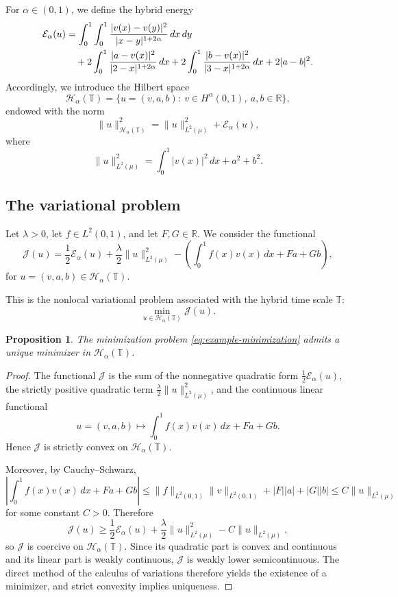 \documentclass[11pt]{article}
\numberwithin{equation}{section}
\newtheorem{proposition}[theorem]{Proposition}
\theoremstyle{definition}
\begin{document}
For $\alpha\in(0,1)$, we define the hybrid energy
\begin{align}
\mathcal E_\alpha(u)
&=
\int_0^1\int_0^1
\frac{|v(x)-v(y)|^2}{|x-y|^{1+2\alpha}}\,dx\,dy
\notag\\
&\quad
+2\int_0^1\frac{|a-v(x)|^2}{|2-x|^{1+2\alpha}}\,dx
+2\int_0^1\frac{|b-v(x)|^2}{|3-x|^{1+2\alpha}}\,dx
+2|a-b|^2.
\label{eq:example-energy}
\end{align}
Accordingly, we introduce the Hilbert space
\[
\mathcal H_\alpha(\mathbb T)
=
\bigl\{u=(v,a,b):\ v\in H^\alpha(0,1),\ a,b\in\mathbb R\bigr\},
\]
endowed with the norm
\[
\|u\|_{\mathcal H_\alpha(\mathbb T)}^2
=
\|u\|_{L^2(\mu)}^2+\mathcal E_\alpha(u),
\]
where
\[
\|u\|_{L^2(\mu)}^2=\int_0^1 |v(x)|^2\,dx+a^2+b^2.
\]

\subsection{The variational problem}

Let $\lambda>0$, let $f\in L^2(0,1)$, and let $F,G\in\mathbb R$. We consider the functional
\begin{equation}\label{eq:example-functional}
\mathcal J(u)
=
\frac12\mathcal E_\alpha(u)
+\frac{\lambda}{2}\|u\|_{L^2(\mu)}^2
-
\left(
\int_0^1 f(x)v(x)\,dx+Fa+Gb
\right),
\end{equation}
for $u=(v,a,b)\in \mathcal H_\alpha(\mathbb T)$.

This is the nonlocal variational problem associated with the hybrid time scale $\mathbb T$:
\begin{equation}\label{eq:example-minimization}
\min_{u\in \mathcal H_\alpha(\mathbb T)} \mathcal J(u).
\end{equation}

\begin{proposition}\label{prop:example-existence}
The minimization problem \eqref{eq:example-minimization} admits a unique minimizer in $\mathcal H_\alpha(\mathbb T)$.
\end{proposition}

\begin{proof}
The functional $\mathcal J$ is the sum of the nonnegative quadratic form $\frac12\mathcal E_\alpha(u)$, the strictly positive quadratic term $\frac{\lambda}{2}\|u\|_{L^2(\mu)}^2$, and the continuous linear functional
\[
u=(v,a,b)\mapsto \int_0^1 f(x)v(x)\,dx+Fa+Gb.
\]
Hence $\mathcal J$ is strictly convex on $\mathcal H_\alpha(\mathbb T)$.

Moreover, by Cauchy--Schwarz,
\[
\left|\int_0^1 f(x)v(x)\,dx+Fa+Gb\right|
\le
\|f\|_{L^2(0,1)}\|v\|_{L^2(0,1)}+|F||a|+|G||b|
\le
C\|u\|_{L^2(\mu)}
\]
for some constant $C>0$. Therefore
\[
\mathcal J(u)
\ge
\frac12\mathcal E_\alpha(u)+\frac{\lambda}{2}\|u\|_{L^2(\mu)}^2-C\|u\|_{L^2(\mu)},
\]
so $\mathcal J$ is coercive on $\mathcal H_\alpha(\mathbb T)$. Since its quadratic part is convex and continuous and its linear part is weakly continuous, $\mathcal J$ is weakly lower semicontinuous. The direct method of the calculus of variations therefore yields the existence of a minimizer, and strict convexity implies uniqueness.
\end{proof}
\end{document}

